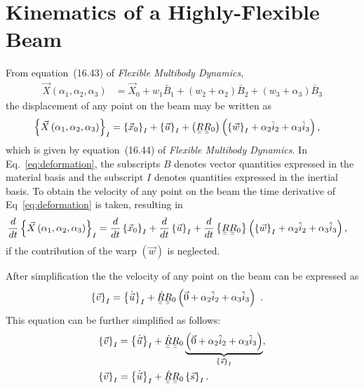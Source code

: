 \documentclass[a4paper]{article}
\newcommand{\ubar}[1]{\underaccent{\bar}{#1}}
\begin{document}
\section*{Kinematics of a Highly-Flexible Beam}

From equation~(16.43) of \textit{Flexible Multibody Dynamics}, \begin{align}
  \vec{X}\left( \alpha_{1}, \alpha_{2}, \alpha_{3} \right)  
  &= \vec{X}_{0} + w_{1}\bar{B}_{1} + \left( w_{2} + \alpha_{2} \right)\bar{B}_{2}
  + \left( w_{3} + \alpha_{3} \right)\bar{B}_{3}
  \label{eq:1643}
\end{align}
the displacement of any point on the beam may be written as 
\begin{align}
  \left\{ \vec{X}\left( \alpha_{1}, \alpha_{2}, \alpha_{3} \right) \right\}_{I}  
  &= \left\{ \vec{x}_{0} \right\}_{I} 
  + \left\{ \vec{u} \right\}_{I} 
  + \left( \ubar{\ubar{R}} \ubar{\ubar{R}}_{0} \right) 
  \left( \left\{ \vec{w} \right\}_{I} + \alpha_{2} \hat{i}_{2} + \alpha_{3} \hat{i}_{3} \right),
  \label{eq:deformation}
\end{align}
which is given by equation~(16.44) of \textit{Flexible Multibody Dynamics}.  In Eq.~\eqref{eq:deformation}, the subscripts $B$ denotes vector quantities expressed in the material basis and the subscript $I$ denotes quantities expressed in the inertial basis.  To obtain the velocity of any point on the beam the time derivative of Eq~\eqref{eq:deformation} is taken, resulting in
\begin{align}
  \frac{d}{dt}\left\{ \vec{X}\left( \alpha_{1}, \alpha_{2}, \alpha_{3} \right) \right\}_{I}  
  &= \frac{d}{dt} \left\{ \vec{x}_{0} \right\}_{I} 
  + \frac{d}{dt} \left\{ \vec{u} \right\}_{I} 
  + \frac{d}{dt} \left\{ \ubar{\ubar{R}} \ubar{\ubar{R}}_{0} \right\}
  \left( \left\{ \vec{w} \right\}_{I} + \alpha_{2} \hat{i}_{2} + \alpha_{3} \hat{i}_{3} \right), 
  \label{eq:DdefDt}
\end{align}
if the contribution of the warp $\left( \vec{w} \right)$ is neglected.

After simplification the the velocity of any point on the beam can be expressed as  
\begin{align}
  \left\{ \vec{v} \right\}_{I} 
  &= \left\{ \dot{ \vec{u}}\right\}_{I} 
  + \ubar{\ubar{\dot{R}}}\ubar{\ubar{R}}_{0} 
  \left( \vec{0} + \alpha_{2} \hat{i}_{2} + \alpha_{3} \hat{i}_{3} \right) \ .
\end{align}
This equation can be further simplified as follows: 
\begin{align}
  \left\{ \vec{v} \right\}_{I}  
  &= \left\{ \dot{ \vec{u}}\right\}_{I} 
  +  \ubar{\ubar{\dot{R}}} \ubar{\ubar{R}}_{0} 
  \underbrace{\left( \vec{0} + \alpha_{2} \hat{i}_{2} 
  + \alpha_{3} \hat{i}_{3} \right)}_{\left\{ \vec{s} \right\}_{I}}, \\
  \left\{ \vec{v} \right\}_{I} 
  &=  \left\{ \dot{ \vec{u}}\right\}_{I} 
  +  \ubar{\ubar{\dot{R}}} \ubar{\ubar{R}}_{0} \left\{ \vec{s} \right\}_{I}.
  \label{eq:velocity1}
\end{align}
\end{document}
